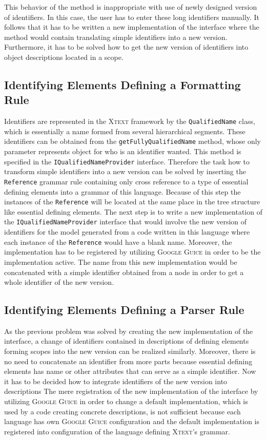\documentclass[12pt,notitlepage,a4paper]{report}
\begin{document}
This behavior of the method is inappropriate with use of  newly designed version of identifiers.  In this case, the user has to enter these long identifiers manually. It follows that it has to be written a new implementation of the interface where the method would contain translating simple identifiers into a new version. Furthermore, it has to be solved how to get the new version of identifiers into object descriptions located in a scope.

\subsection{Identifying Elements Defining a Formatting Rule}

Identifiers are represented in the \textsc{Xtext} framework by the \texttt{QualifiedName} class, which is essentially a name formed from several hierarchical segments. These identifiers can be obtained from the \texttt{getFullyQualifiedName} method, whose only parameter represents object for who is an identifier wanted. This method is specified in the \texttt{IQualifiedNameProvider} interface. Therefore the task how to transform simple identifiers into a new version can be solved by inserting the \texttt{Reference} grammar rule containing only cross reference to a type of essential defining elements into a grammar of this language. Because of this step the instances of the \texttt{Reference} will be located at the same place in the tree structure like essential defining elements. The next step is to write a new implementation of the \texttt{IQualifiedNameProvider} interface  that would involve  the new version of identifiers for the model generated from a code written in this language where each instance of the \texttt{Reference} would have a blank name. Moreover, the implementation has to be registered by utilizing \textsc{Google Guice} in order to be the implementation active. The name from this new implementation would be concatenated with a simple identifier obtained from a node in order to get a whole identifier of the new version.

\subsection{Identifying Elements Defining a Parser Rule}

As the previous problem was solved by creating the new implementation of the  interface, a change of identifiers contained in descriptions of defining elements forming scopes into the new version can be realized similarly. Moreover, there is no need to concatenate an identifier from more parts because essential defining elements has name or other attributes that can serve as a simple identifier.  Now it has to be decided how to integrate identifiers of the new version into descriptions The mere registration of the new implementation of the interface by utilizing \textsc{Google Guice} in order to change a default  implementation, which is used by a code creating concrete descriptions, is not sufficient because each language has own \textsc{Google Guice} configuration and the default implementation is registered into configuration of the language defining \textsc{Xtext}'s grammar.
\end{document}
